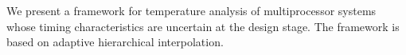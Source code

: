We present a framework for temperature analysis of multiprocessor systems whose
timing characteristics are uncertain at the design stage. The framework is
based on adaptive hierarchical interpolation.
